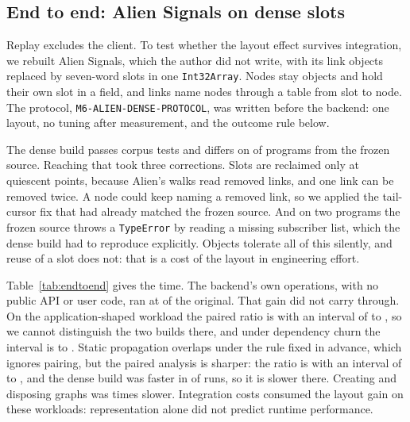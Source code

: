 \documentclass[11pt]{article}
\begin{document}
\subsection{End to end: Alien Signals on dense slots}
\label{sec:endtoend}

Replay excludes the client. To test whether the layout effect survives integration, we rebuilt Alien Signals, which the author did not write, with its link objects replaced by seven-word slots in one \texttt{Int32Array}. Nodes stay objects and hold their own slot in a field, and links name nodes through a table from slot to node. The protocol, \texttt{M6-ALIEN-DENSE-PROTOCOL}, was written before the backend: one layout, no tuning after measurement, and the outcome rule below.

The dense build passes \mSixCorpus{} corpus tests and differs on \mSixDiffer{} of \mSixPrograms{} programs from the frozen source. Reaching that took three corrections. Slots are reclaimed only at quiescent points, because Alien's walks read removed links, and one link can be removed twice. A node could keep naming a removed link, so we applied the tail-cursor fix that had already matched the frozen source. And on two programs the frozen source throws a \texttt{TypeError} by reading a missing subscriber list, which the dense build had to reproduce explicitly. Objects tolerate all of this silently, and reuse of a slot does not: that is a cost of the layout in engineering effort.

\begin{table}[tbp]
\centering
\footnotesize

\caption{Wall time per replay over \mSixRuns{} fresh pinned processes, median [min, max]. The paired column gives the median of the ten within-run ratios and a distribution-free \mSixCoverage{}\% interval from their second and ninth order statistics. The last column applies the rule fixed in advance, which compares process ranges without pairing.}
\label{tab:endtoend}
\end{table}

Table~\ref{tab:endtoend} gives the time. The backend's own operations, with no public API or user code, ran at \mSixSystemRatio{} of the original. That gain did not carry through. On the application-shaped workload the paired ratio is \mSixAppRatio{} with an interval of \mSixAppLow{} to \mSixAppHigh{}, so we cannot distinguish the two builds there, and under dependency churn the interval is \mSixDynamicLow{} to \mSixDynamicHigh{}. Static propagation overlaps under the rule fixed in advance, which ignores pairing, but the paired analysis is sharper: the ratio is \mSixPropagateRatio{} with an interval of \mSixPropagateLow{} to \mSixPropagateHigh{}, and the dense build was faster in \mSixPropagateFaster{} of \mSixRuns{} runs, so it is slower there. Creating and disposing graphs was \mSixCreateRatio{} times slower. Integration costs consumed the layout gain on these workloads: representation alone did not predict runtime performance.
\end{document}
